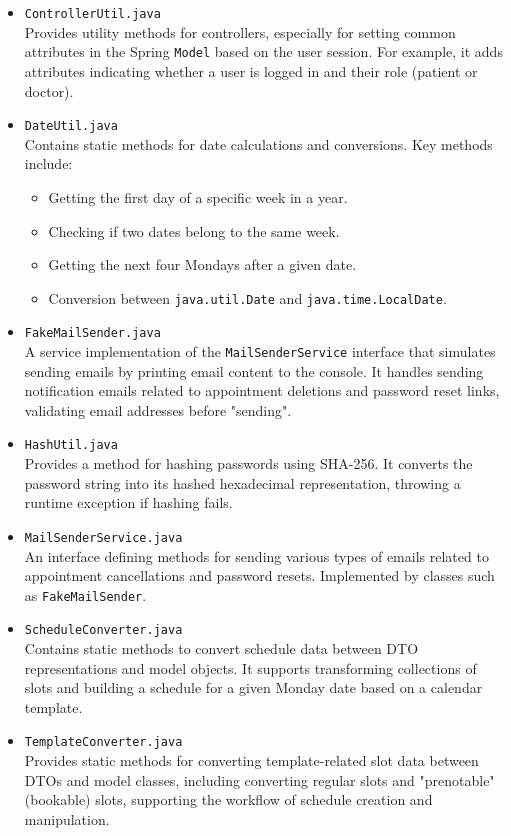 \begin{itemize}
	\item \texttt{ControllerUtil.java}\\
	Provides utility methods for controllers, especially for setting common attributes in the Spring \texttt{Model} based on the user session. For example, it adds attributes indicating whether a user is logged in and their role (patient or doctor).
	
	\item \texttt{DateUtil.java}\\
	Contains static methods for date calculations and conversions. Key methods include:
	\begin{itemize}
		\item Getting the first day of a specific week in a year.
		\item Checking if two dates belong to the same week.
		\item Getting the next four Mondays after a given date.
		\item Conversion between \texttt{java.util.Date} and \texttt{java.time.LocalDate}.
	\end{itemize}
	
	\item \texttt{FakeMailSender.java}\\
	A service implementation of the \texttt{MailSenderService} interface that simulates sending emails by printing email content to the console. It handles sending notification emails related to appointment deletions and password reset links, validating email addresses before "sending".
	
	\item \texttt{HashUtil.java}\\
	Provides a method for hashing passwords using SHA-256. It converts the password string into its hashed hexadecimal representation, throwing a runtime exception if hashing fails.
	
	\item \texttt{MailSenderService.java}\\
	An interface defining methods for sending various types of emails related to appointment cancellations and password resets. Implemented by classes such as \texttt{FakeMailSender}.
	
	\item \texttt{ScheduleConverter.java}\\
	Contains static methods to convert schedule data between DTO representations and model objects. It supports transforming collections of slots and building a schedule for a given Monday date based on a calendar template.
	
	\item \texttt{TemplateConverter.java}\\
	Provides static methods for converting template-related slot data between DTOs and model classes, including converting regular slots and "prenotable" (bookable) slots, supporting the workflow of schedule creation and manipulation.
\end{itemize}


